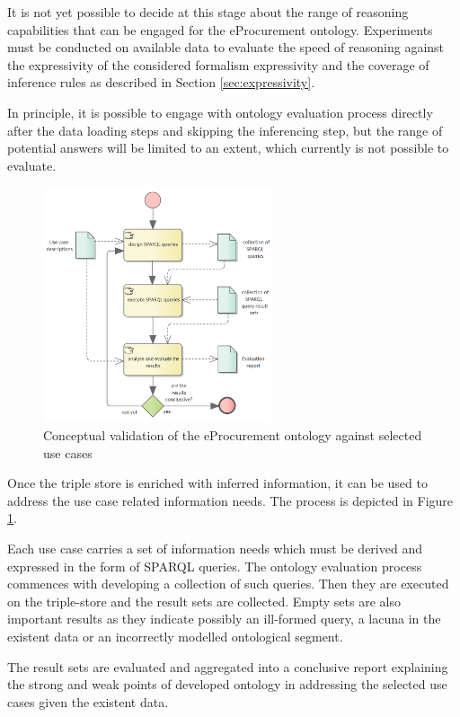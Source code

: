 	It is not yet possible to decide at this stage about the range of reasoning capabilities that can be engaged for the eProcurement ontology. Experiments must be conducted on available data to evaluate the speed of reasoning against the expressivity of the considered formalism expressivity and the coverage of inference rules as described in Section \ref{sec:expressivity}.
	
	In principle, it is possible to engage with ontology evaluation process directly after the data loading steps and skipping the inferencing step, but the range of potential answers will be limited to an extent, which currently is not possible to evaluate.
		
	\begin{figure}[!ht]		
		\centering
		\includegraphics[width=0.6\textwidth]{../img/conceptualValidation.png}
		\caption{Conceptual validation of the eProcurement ontology against selected use cases}
		\label{fig:ontology-validation}
	\end{figure}
	
	Once the triple store is enriched with inferred information, it can be used to address the use case related information needs. The process is depicted in Figure \ref{fig:ontology-validation}. 
	
	Each use case carries a set of information needs which must be derived and expressed in the form of SPARQL queries. The ontology evaluation process commences with developing a collection of such queries. Then they are executed on the triple-store and the result sets are collected. Empty sets are also important results as they indicate possibly an ill-formed query, a lacuna in the existent data or an incorrectly modelled ontological segment.
	
	The result sets are evaluated and aggregated into a conclusive report explaining the strong and weak points of developed ontology in addressing the selected use cases given the existent data.  
	
	
	
	
	